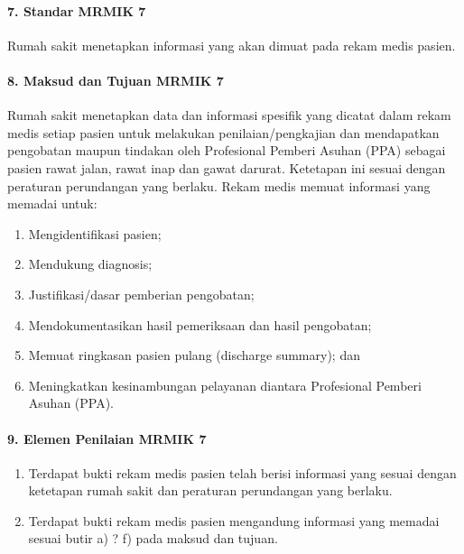 \documentclass[
]{book}
\providecommand{\tightlist}{%
  \setlength{\itemsep}{0pt}\setlength{\parskip}{0pt}}
\begin{document}
\hypertarget{standar-mrmik-7}{%
\paragraph*{7. Standar MRMIK 7}\label{standar-mrmik-7}}

Rumah sakit menetapkan informasi yang akan dimuat pada rekam medis pasien.

\hypertarget{maksud-dan-tujuan-mrmik-7}{%
\paragraph*{8. Maksud dan Tujuan MRMIK 7}\label{maksud-dan-tujuan-mrmik-7}}

Rumah sakit menetapkan data dan informasi spesifik yang dicatat dalam rekam medis setiap pasien untuk melakukan penilaian/pengkajian dan mendapatkan pengobatan maupun tindakan oleh Profesional Pemberi Asuhan (PPA) sebagai pasien rawat jalan, rawat inap dan gawat darurat. Ketetapan ini sesuai dengan peraturan perundangan yang berlaku. Rekam medis memuat informasi yang memadai untuk:

\begin{enumerate}
\def\labelenumi{\alph{enumi}.}
\tightlist
\item
  Mengidentifikasi pasien;\\
\item
  Mendukung diagnosis;\\
\item
  Justifikasi/dasar pemberian pengobatan;\\
\item
  Mendokumentasikan hasil pemeriksaan dan hasil
  pengobatan;\\
\item
  Memuat ringkasan pasien pulang (discharge summary); dan
\item
  Meningkatkan kesinambungan pelayanan diantara Profesional Pemberi Asuhan (PPA).
\end{enumerate}

\hypertarget{elemen-penilaian-mrmik-7}{%
\paragraph*{9. Elemen Penilaian MRMIK 7}\label{elemen-penilaian-mrmik-7}}

\begin{enumerate}
\def\labelenumi{\alph{enumi}.}
\tightlist
\item
  Terdapat bukti rekam medis pasien telah berisi informasi yang sesuai dengan ketetapan rumah sakit dan peraturan perundangan yang berlaku.
\item
  Terdapat bukti rekam medis pasien mengandung informasi yang memadai sesuai butir a) ? f) pada maksud dan tujuan.
\end{enumerate}
\end{document}
